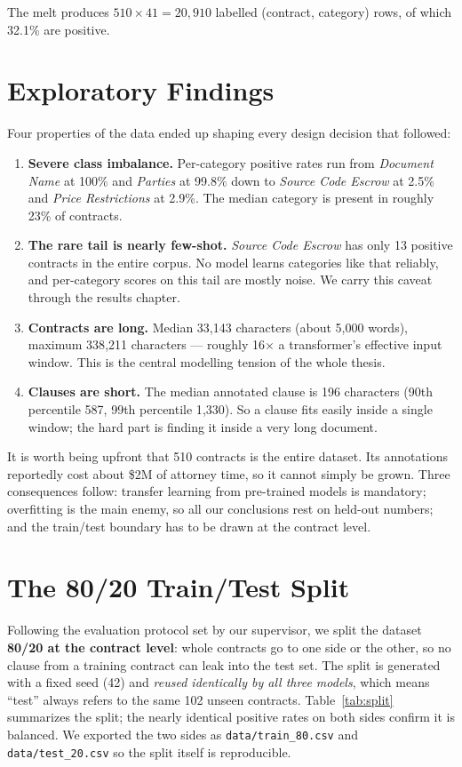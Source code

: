 The melt produces $510 \times 41 = 20{,}910$ labelled (contract, category) rows, of which 32.1\% are positive.

\section{Exploratory Findings}
\label{sec:eda}
Four properties of the data ended up shaping every design decision that followed:

\begin{enumerate}[itemsep=2pt]
  \item \textbf{Severe class imbalance.} Per-category positive rates run from \emph{Document Name} at 100\% and \emph{Parties} at 99.8\% down to \emph{Source Code Escrow} at 2.5\% and \emph{Price Restrictions} at 2.9\%. The median category is present in roughly 23\% of contracts.
  \item \textbf{The rare tail is nearly few-shot.} \emph{Source Code Escrow} has only 13 positive contracts in the entire corpus. No model learns categories like that reliably, and per-category scores on this tail are mostly noise. We carry this caveat through the results chapter.
  \item \textbf{Contracts are long.} Median 33{,}143 characters (about 5{,}000 words), maximum 338{,}211 characters --- roughly 16$\times$ a transformer's effective input window. This is the central modelling tension of the whole thesis.
  \item \textbf{Clauses are short.} The median annotated clause is 196 characters (90th percentile 587, 99th percentile 1{,}330). So a clause fits easily inside a single window; the hard part is finding it inside a very long document.
\end{enumerate}

It is worth being upfront that 510 contracts is the entire dataset. Its annotations reportedly cost about \$2M of attorney time, so it cannot simply be grown. Three consequences follow: transfer learning from pre-trained models is mandatory; overfitting is the main enemy, so all our conclusions rest on held-out numbers; and the train/test boundary has to be drawn at the contract level.

\section{The 80/20 Train/Test Split}
Following the evaluation protocol set by our supervisor, we split the dataset \textbf{80/20 at the contract level}: whole contracts go to one side or the other, so no clause from a training contract can leak into the test set. The split is generated with a fixed seed (42) and \emph{reused identically by all three models}, which means ``test'' always refers to the same 102 unseen contracts. Table~\ref{tab:split} summarizes the split; the nearly identical positive rates on both sides confirm it is balanced. We exported the two sides as \texttt{data/train\_80.csv} and \texttt{data/test\_20.csv} so the split itself is reproducible.

